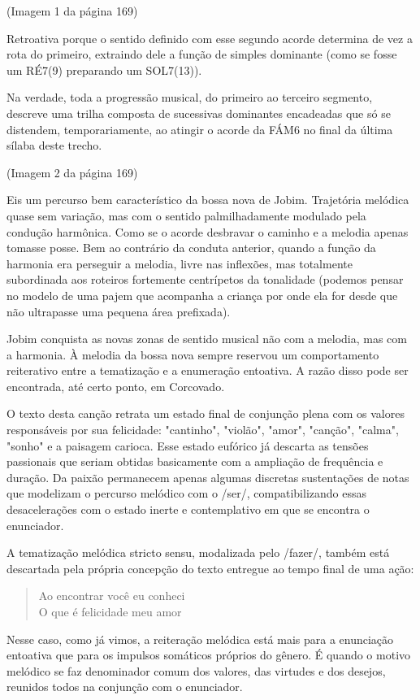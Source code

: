 (Imagem 1 da página 169)

Retroativa porque o sentido definido com esse segundo acorde determina
de vez a rota do primeiro, extraindo dele a função de simples dominante
(como se fosse um RÉ7(9) preparando um SOL7(13)).

Na verdade, toda a progressão musical, do primeiro ao terceiro segmento,
descreve uma trilha composta de sucessivas dominantes encadeadas que só
se distendem, temporariamente, ao atingir o acorde da FÁM6 no final da
última sílaba deste trecho.

(Imagem 2 da página 169)

Eis um percurso bem característico da bossa nova de Jobim. Trajetória
melódica quase sem variação, mas com o sentido palmilhadamente modulado
pela condução harmônica. Como se o acorde desbravar o caminho e a
melodia apenas tomasse posse. Bem ao contrário da conduta anterior,
quando a função da harmonia era perseguir a melodia, livre nas
inflexões, mas totalmente subordinada aos roteiros fortemente
centrípetos da tonalidade (podemos pensar no modelo de uma pajem que
acompanha a criança por onde ela for desde que não ultrapasse uma
pequena área prefixada).

Jobim conquista as novas zonas de sentido musical não com a melodia, mas
com a harmonia. À melodia da bossa nova sempre reservou um comportamento
reiterativo entre a tematização e a enumeração entoativa. A razão disso
pode ser encontrada, até certo ponto, em Corcovado.~

O texto desta canção retrata um estado final de conjunção plena com os
valores responsáveis por sua felicidade: "cantinho", "violão", "amor",
"canção", "calma", "sonho" e a paisagem carioca. Esse estado eufórico já
descarta as tensões passionais que seriam obtidas basicamente com a
ampliação de frequência e duração. Da paixão permanecem apenas algumas
discretas sustentações de notas que modelizam o percurso melódico com o
/ser/, compatibilizando essas desacelerações com o estado inerte e
contemplativo em que se encontra o enunciador.~

A tematização melódica stricto sensu, modalizada pelo /fazer/, também
está descartada pela própria concepção do texto entregue ao tempo final
de uma ação:

\begin{verse}
Ao encontrar você eu conheci\\
O que é felicidade meu amor
\end{verse}

Nesse caso, como já vimos, a reiteração melódica está mais para a
enunciação entoativa que para os impulsos somáticos próprios do gênero.
É quando o motivo melódico se faz denominador comum dos valores, das
virtudes e dos desejos, reunidos todos na conjunção com o enunciador.

